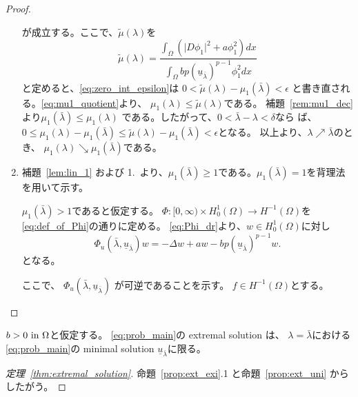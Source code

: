 \begin{proof}
\begin{enumerate}[1.]
        が成立する。ここで、$\tilde{\mu}(\lambda)$を
        \[
         \tilde{\mu}(\lambda) = 
        \frac{\displaystyle \int_\Omega \left( \lvert D\phi_1
                                              \rvert^2
                                              + a
                                             \phi_1^2\right) dx}
         {\displaystyle 
         \int_\Omega bp (\underline{u}_{\bar{\lambda}})^{p-1} \phi_1^2 dx}
        \]
        と定めると、\eqref{eq:zero_int_epsilon}は
        $0 < \tilde{\mu}(\lambda) - \mu_1(\bar{\lambda}) < \epsilon$
        と書き直される。\eqref{eq:mu1_quotient}より、
        $\mu_1(\lambda) \leq \tilde{\mu}(\lambda)$である。
        補題~\ref{rem:mu1_dec}より$\mu_1(\bar{\lambda}) \leq
        \mu_1(\lambda)$
        である。したがって、$0 < \bar{\lambda} - \lambda < \delta$なら
        ば、$0 \leq \mu_1 (\lambda) - \mu_1 (\bar{\lambda}) \leq
        \tilde{\mu}(\lambda) - \mu_1 (\bar{\lambda}) < \epsilon$となる。
        以上より、$\lambda \nearrow \bar{\lambda}$のとき、
        $\mu_1(\lambda) \searrow \mu_1(\bar{\lambda})$である。
  \item 補題~\ref{lem:lin_1} および 1.~より、$\mu_1(\bar{\lambda})
        \geq 1$である。$\mu_1(\bar{\lambda}) = 1$を背理法を用いて示す。
        
        $\mu_1(\bar{\lambda}) > 1$であると仮定する。
        $\Phi \colon [0,\infty) \times H^1_0 (\Omega) \to
        H^{-1}(\Omega)$を
        \eqref{eq:def_of_Phi}の通りに定める。
        \eqref{eq:Phi_dr}より、$w \in H^1_0(\Omega)$に対し
        \begin{equation}
         \Phi_u (\bar{\lambda}, \underline{u}_{\bar{\lambda}})
          w = -\Delta w + aw - b
          p(\underline{u}_{\bar{\lambda}})^{p-1} w.
          \label{eq:Phi_dr_barlambda}
        \end{equation}
        となる。

        ここで、
        $\Phi_u (\bar{\lambda}, \underline{u}_{\bar{\lambda}})$
        が可逆であることを示す。
        $f \in H^{-1}(\Omega)$とする。
 \end{enumerate}
\end{proof}

\begin{prop} \label{prop:ext_uni}
 $b > 0 ~\text{in}~ \Omega$と仮定する。
 \ref{eq:prob_main}の extremal solution は、
 $\lambda = \bar{\lambda}$における\ref{eq:prob_main}の minimal
 solution $\underline{u}_{\bar{\lambda}}$に限る。
\end{prop}

\begin{proof}[定理~\ref{thm:extremal_solution}]
 命題~\ref{prop:ext_exi}.1 と命題~\ref{prop:ext_uni} からしたがう。\qedhere
\end{proof}

